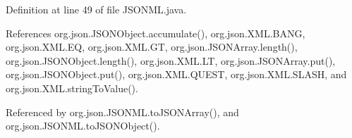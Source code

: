 Definition at line 49 of file J\-S\-O\-N\-M\-L.\-java.



References org.\-json.\-J\-S\-O\-N\-Object.\-accumulate(), org.\-json.\-X\-M\-L.\-B\-A\-N\-G, org.\-json.\-X\-M\-L.\-E\-Q, org.\-json.\-X\-M\-L.\-G\-T, org.\-json.\-J\-S\-O\-N\-Array.\-length(), org.\-json.\-J\-S\-O\-N\-Object.\-length(), org.\-json.\-X\-M\-L.\-L\-T, org.\-json.\-J\-S\-O\-N\-Array.\-put(), org.\-json.\-J\-S\-O\-N\-Object.\-put(), org.\-json.\-X\-M\-L.\-Q\-U\-E\-S\-T, org.\-json.\-X\-M\-L.\-S\-L\-A\-S\-H, and org.\-json.\-X\-M\-L.\-string\-To\-Value().



Referenced by org.\-json.\-J\-S\-O\-N\-M\-L.\-to\-J\-S\-O\-N\-Array(), and org.\-json.\-J\-S\-O\-N\-M\-L.\-to\-J\-S\-O\-N\-Object().


